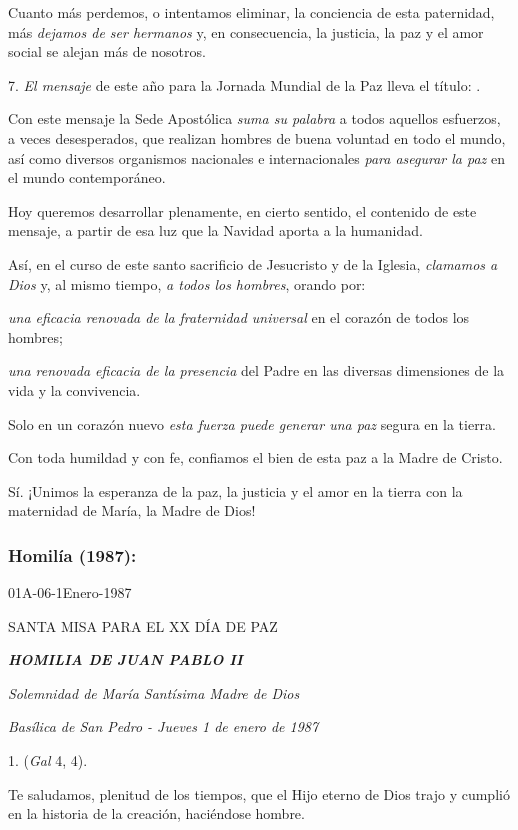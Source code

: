 \begin{body}
	Cuanto más perdemos, o intentamos eliminar, la conciencia de esta paternidad, más \emph{dejamos de ser hermanos} y, en consecuencia, la justicia, la paz y el amor social se alejan más de nosotros.
	
	7. \emph{El mensaje} de este año para la Jornada Mundial de la Paz lleva el título: .
	
	Con este mensaje la Sede Apostólica \emph{suma su palabra} a todos aquellos esfuerzos, a veces desesperados, que realizan hombres de buena voluntad en todo el mundo, así como diversos organismos nacionales e internacionales \emph{para asegurar la paz} en el mundo contemporáneo.
	
	Hoy queremos desarrollar plenamente, en cierto sentido, el contenido de este mensaje, a partir de esa luz que la Navidad aporta a la humanidad.
	
	Así, en el curso de este santo sacrificio de Jesucristo y de la Iglesia, \emph{clamamos a Dios} y, al mismo tiempo, \emph{a todos los hombres}, orando por:
	
	\emph{una eficacia renovada de la fraternidad universal} en el corazón de todos los hombres;
	
	\emph{una renovada eficacia de la presencia} del Padre en las diversas dimensiones de la vida y la convivencia.
	
	Solo en un corazón nuevo \emph{esta fuerza puede generar una paz} segura en la tierra.
	
	Con toda humildad y con fe, confiamos el bien de esta paz a la Madre de Cristo.
	
	Sí. ¡Unimos la esperanza de la paz, la justicia y el amor en la tierra con la maternidad de María, la Madre de Dios!
	
	\subsubsection{Homilía (1987): } 01A-06-1Enero-1987
	
	SANTA MISA PARA EL XX DÍA DE PAZ
	
	\emph{\textbf{HOMILIA DE JUAN PABLO II}}
	
	\emph{Solemnidad de María Santísima Madre de Dios}
	
	\emph{Basílica de San Pedro - Jueves 1 de enero de 1987}
	
	1.  (\emph{Gal} 4, 4).
	
	Te saludamos, plenitud de los tiempos, que el Hijo eterno de Dios trajo y cumplió en la historia de la creación, haciéndose hombre.
	

\end{body}
